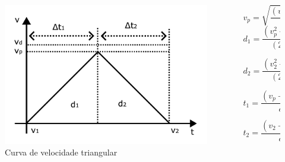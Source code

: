 \documentclass[aspectratio=169]{beamer}
\begin{document}
\begin{frame}
  \frametitle{\insertsubsection}
  \begin{columns}
    \begin{column}{.5\textwidth}
      \begin{figure}[H]
        \centering
        \caption{Curva de velocidade triangular}
        \includegraphics[width=1\textwidth]{triang_curv}

        \label{fig:triang_curv}
      \end{figure}
    \end{column}
    \begin{column}{.45\textwidth}
      \begin{equation}
        \label{eq:v_p}
        v_p = \sqrt{\frac{(v_1^2+v_2^2)}{2}+a d}
      \end{equation}
      \begin{equation}
        \label{eq:des_seg_1_tri}
        d_1 = \frac{(v_p^2-v_1^2)}{(2 a)}
      \end{equation}
      
      \begin{equation}
        \label{eq:des_seg_2_tri}
        d_2 = \frac{(v_2^2-v_p^2)}{(2 a)}
      \end{equation}
      
      \begin{equation}
        \label{eq:dt_seg_1_tri}
        t_1 = \frac{(v_p-v_1)}{a}
      \end{equation}
      
      \begin{equation}
        \label{eq:dt_seg_2_tri}
        t_2 = \frac{(v_2-v_p)}{a}
      \end{equation}
    \end{column}
  \end{columns}
\end{frame}
\end{document}
